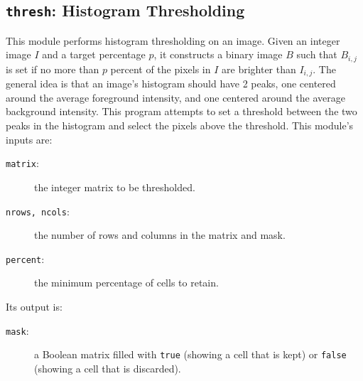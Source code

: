 \subsection{{\tt{thresh}}:
	Histogram Thresholding
	\label{s:toys-thresh}}

This module performs histogram thresholding on an image.
Given an integer image $I$ and a target percentage $p$,
it constructs a binary image $B$
such that $B_{i,j}$ is set
if no more than $p$ percent of the pixels in $I$ are brighter than $I_{i,j}$.
The general idea is that an image's histogram should have 2 peaks,
one centered around the average foreground intensity,
and one centered around the average background intensity.
This program attempts to set
a threshold between the two peaks in the histogram
and select the pixels above the threshold.
This module's inputs are:
\begin{description}
\item[{\tt{matrix}}:]
	the integer matrix to be thresholded.
\item[{\tt{nrows, ncols}}:]
	the number of rows and columns in the matrix and mask.
\item[{\tt{percent}}:]
	the minimum percentage of cells to retain.
\end{description}
Its output is:
\begin{description}
\item[{\tt{mask}}:]
	a Boolean matrix filled with {\tt{true}} (showing a cell that is kept) or {\tt{false}} (showing a cell that is discarded).
\end{description}
